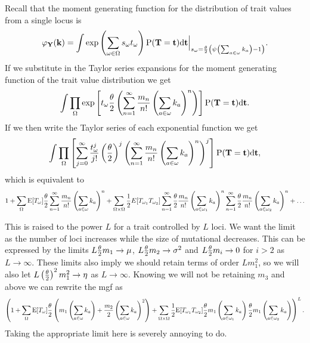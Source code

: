 Recall that the moment generating function for the distribution of trait values
from a single locus is
\begin{equation*}
  \varphi_{\mathbf{Y}}(\mathbf{k}) = \int \exp \left( \sum_{\omega \in \Omega} s_{\omega}t_{\omega} \right)
  \mathrm{P}(\mathbf{T}=\mathbf{t})\mathrm{d}\mathbf{t}
  \Bigr|_{s_{\omega}=\frac{\theta}{2} \left( \psi\left(\sum_{a \in \omega}k_{a}\right) -1 \right)}.
\end{equation*}
If we substitute in the Taylor series expansions for the moment generating
function of the trait value distribution we get
\begin{equation*}
  \int \prod_{\Omega} \exp\left[ t_{\omega} \frac{\theta}{2} \left( \sum_{n=1}^{\infty} \frac{m_n}{n!}
    \left( \sum_{a \in \omega} k_a \right)^n \right) \right]
  \mathrm{P}(\mathbf{T} = \mathbf{t}) \mathrm{d}\mathbf{t}.
\end{equation*}
If we then write the Taylor series of each exponential function we get
\begin{equation*}
  \int \prod_{\Omega} \left[ \sum_{j=0}^\infty \frac{t_{\omega}^j}{j!}
  \left( \frac{\theta}{2} \right)^j \left( \sum_{n=1}^{\infty} \frac{m_n}{n!}
  \left( \sum_{a \in \omega} k_a \right)^n \right)^j \right]
  \mathrm{P}(\mathbf{T} = \mathbf{t}) \mathrm{d}\mathbf{t},
\end{equation*}
which is equivalent to
\begin{equation*}
  1 + \sum_{\Omega} \mathrm{E}[T_\omega] \frac{\theta}{2} \sum_{n=1}^{\infty} \frac{m_n}{n!} \left(
  \sum_{a \in \omega} k_a \right)^n +
  \sum_{\Omega \times \Omega} \frac{1}{2} E[T_{\omega_1}T_{\omega_2}]
  \sum_{n=1}^{\infty} \frac{\theta}{2} \frac{m_n}{n!} \left(\sum_{a \in \omega_1} k_a \right)^n
  \sum_{n=1}^{\infty} \frac{\theta}{2} \frac{m_n}{n!} \left(\sum_{a \in \omega_2} k_a \right)^n + \ldots
\end{equation*}

This is raised to the power $L$ for a trait controlled by $L$ loci. We want the
limit as the number of loci increases while the size of mutational decreases.
This can be expressed by the limits $L \frac{\theta}{2} m_1 \to \mu$, $L \frac{\theta}{2} m_2\to \sigma^2$
and $L \frac{\theta}{2} m_i\to 0$ for $i>2$ as $L \to \infty$. These limits also imply we
should retain terms of order $L m_1^2$, so we will also let $L \left(\frac{\theta}{2}\right)^2
m_1^2 \to \eta$ as $L \to \infty$. Knowing we will not be retaining $m_3$ and
above we can rewrite the mgf as
\begin{equation*}
  \left(1 + \sum_{\Omega} \mathrm{E}[T_\omega] \frac{\theta}{2} \left(m_1 \left(\sum_{a \in \omega} k_a \right) +
  \frac{m_2}{2} \left(\sum_{a \in \omega} k_a \right)^2\right) +
  \sum_{\Omega \times \Omega} \frac{1}{2} \mathrm{E}[T_{\omega_1}T_{\omega_2}]
  \frac{\theta}{2} m_1 \left(\sum_{a \in \omega_1} k_a \right)
  \frac{\theta}{2} m_1 \left(\sum_{a \in \omega_2} k_a \right)\right)^L.
\end{equation*}
Taking the appropriate limit here is severely annoying to do. 

